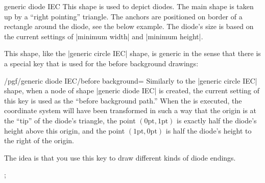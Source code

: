 \begin{shape}{generic diode IEC}
  This shape is used to depict diodes. The main shape is taken up by a
  ``right pointing'' triangle. The anchors are positioned on border of
  a rectangle around the diode, see the below example.  The
  diode's size is based on the current settings of |minimum width| and
  |minimum height|.
\begin{codeexample}[]
\end{codeexample}

  This shape, like the |generic circle IEC| shape, is generic in the
  sense that there is a special key that is used for the before
  background drawings:
  \begin{key}{/pgf/generic diode IEC/before background=}
    Similarly to the |generic circle IEC| shape, when a node of shape
    |generic diode IEC| is created, the current setting of this key is
    used as the ``before background path.''     
    When the  is executed, the coordinate system will have
    been transformed in such a way that the origin is at the ``tip''
    of the diode's triangle, the point $(0\mathrm{pt},1\mathrm{pt})$
    is exactly half the diode's height above this origin, and
    the point $(1\mathrm{pt},0\mathrm{pt})$ is half the diode's height
    to the right of the origin.

    The idea is that you use this key to draw different kinds of diode
    endings. 
\begin{codeexample}[]
\tikz \node [minimum size=1cm,generic diode IEC,
             /pgf/generic diode IEC/before background={
               \pgfpathmoveto{\pgfqpoint{-.5pt}{-1pt}}
               \pgfpathlineto{\pgfqpoint{.5pt}{-1pt}}
               \pgfpathmoveto{\pgfqpoint{0pt}{-1pt}}
               \pgfpathlineto{\pgfqpoint{0pt}{1pt}}
               \pgfpathmoveto{\pgfqpoint{-.5pt}{1pt}}
               \pgfpathlineto{\pgfqpoint{.5pt}{1pt}}
               \pgfusepathqstroke
             },
             draw] {};
\end{codeexample}
  \end{key}
\end{shape}



